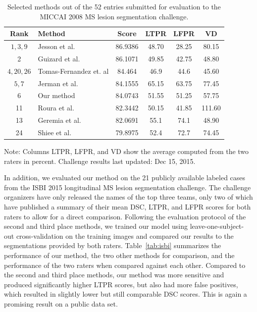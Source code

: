 \begin{table}
%
\caption{Selected methods out of the 52 entries submitted for evaluation to the
MICCAI 2008 MS lesion segmentation challenge.}
\label{tab:miccai}
\begin{center}
\begin{tabular}{@{}clS[table-format=2.2]
S[table-format=2.1,round-precision=1]
S[table-format=2.1,round-precision=1]
S[table-format=2.1,round-precision=1]@{}}
\toprule
Rank & Method & {Score} & {LTPR} & {LFPR} & {VD} \\
\midrule
$1,3,9$  & Jesson et al. \cite{jesson2015} & 86.9386 & 48.70 & 28.25 & 80.15 \\
2  & Guizard et al. \cite{guizard2015}   & 86.1071 & 49.85 & 42.75 & 48.80 \\
$4,20,26$  & Tomas-Fernandez et. al \cite{tomas2015} & 84.464 & 46.9 & 44.6 &
45.60 \\
$5,7$ & Jerman et al. \cite{jerman2015}        & 84.1555 & 65.15 & 63.75 & 77.45 \\
6  & Our method    & 84.0743 & 51.55 & 51.25 & 57.75 \\
11 & Roura et al.   \cite{roura2015} & 82.3442 & 50.15 & 41.85 & 111.60 \\
13 & Geremia et al. \cite{geremia2010}     & 82.0691 & 55.1 & 74.1 & 48.90 \\
24 & Shiee et al. \cite{shiee2010topology} & 79.8975 & 52.4 & 72.7 & 74.45 \\
\bottomrule
\end{tabular}
\end{center}
Note: Columns LTPR, LFPR, and VD show the average computed from the two raters in
percent. Challenge results last updated: Dec 15, 2015.
\end{table}

In addition, we evaluated our method on the 21 publicly available labeled cases
from the ISBI 2015 longitudinal MS lesion segmentation challenge. The challenge
organizers have only released the names of the top three teams, only two of
which have published a summary of their mean DSC, LTPR, and LFPR scores for both
raters to allow for a direct comparison. Following the evaluation protocol of
the second \cite{jesson2015} and third \cite{maier2015} place methods, we
trained our model using leave-one-subject-out cross-validation on the training images and compared our
results to the segmentations provided by both raters. Table~\ref{tab:isbi}
summarizes the performance of our method, the two other methods for comparison,
and the performance of the two raters when compared against each other. Compared
to the second and third place methods, our method was more sensitive and
produced significantly higher LTPR scores, but also had more false positives,
which resulted in slightly lower but still comparable DSC scores. This is again
a promising result on a public data set.

